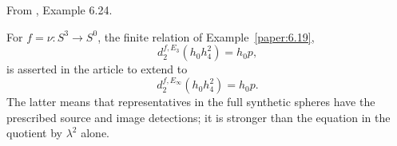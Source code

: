 \begin{proposition}
\label{paper:6.24}
\label{exam:stretchext}
From \cite{LWX126}, Example 6.24.\par
For $f=\nu:S^3\to S^0$, the finite relation of Example~\ref{paper:6.19},
\[
d_2^{f,E_3}(h_0h_4^2)=h_0p,
\]
is asserted in the article to extend to
\[
d_2^{f,E_\infty}(h_0h_4^2)=h_0p.
\]
The latter means that representatives in the full synthetic spheres have the prescribed source and image detections; it is stronger than the equation in the quotient by $\lambda^2$ alone.
\end{proposition}
